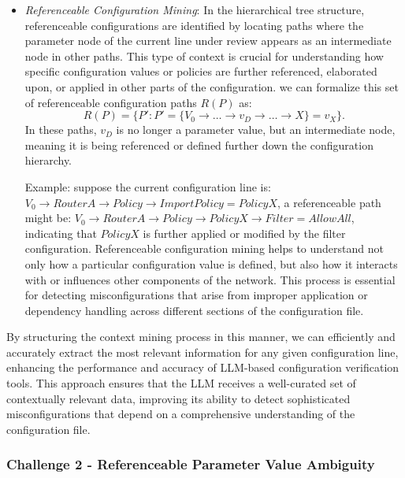\begin{itemize}
    \item \textit{Referenceable Configuration Mining}: In the hierarchical tree structure, referenceable configurations are identified by locating paths where the parameter node of the current line under review appears as an intermediate node in other paths. This type of context is crucial for understanding how specific configuration values or policies are further referenced, elaborated upon, or applied in other parts of the configuration. we can formalize this  set of referenceable configuration paths \( R(P) \) as:
\[
R(P) = \{ P' : P' = \{ V_0 \rightarrow \dots \rightarrow v_D \rightarrow \dots \rightarrow X \} = v_{X}\}.
\]
In these paths, \( v_D \) is no longer a parameter value, but an intermediate node, meaning it is being referenced or defined further down the configuration hierarchy.

Example: suppose the current configuration line is:
\(V_0 \rightarrow RouterA \rightarrow Policy \rightarrow ImportPolicy = PolicyX\), a referenceable path might be:
\(
V_0 \rightarrow  RouterA \rightarrow Policy \rightarrow PolicyX \rightarrow Filter = AllowAll
\),
indicating that \( PolicyX \) is further applied or modified by the filter configuration. Referenceable configuration mining helps to understand not only how a particular configuration value is defined, but also how it interacts with or influences other components of the network. This process is essential for detecting misconfigurations that arise from improper application or dependency handling across different sections of the configuration file.

\end{itemize}

By structuring the context mining process in this manner, we can efficiently and accurately extract the most relevant information for any given configuration line, enhancing the performance and accuracy of LLM-based configuration verification tools. This approach ensures that the LLM receives a well-curated set of contextually relevant data, improving its ability to detect sophisticated misconfigurations that depend on a comprehensive understanding of the configuration file.

\subsubsection{Challenge 2 - Referenceable Parameter Value Ambiguity}

